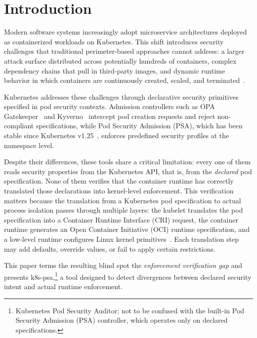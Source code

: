 \documentclass[sigconf]{acmart}
\begin{document}

\maketitle

\section{Introduction}

Modern software systems increasingly adopt microservice architectures deployed as containerized workloads on Kubernetes. This shift introduces security challenges that traditional perimeter-based approaches cannot address: a larger attack surface distributed across potentially hundreds of containers, complex dependency chains that pull in third-party images, and dynamic runtime behavior in which containers are continuously created, scaled, and terminated~\cite{wong2023, devipriya2023}.

Kubernetes addresses these challenges through declarative security primitives specified in pod security contexts. Admission controllers such as OPA Gatekeeper~\cite{gatekeeper2024} and Kyverno~\cite{kyverno2024} intercept pod creation requests and reject non-compliant specifications, while Pod Security Admission (PSA), which has been stable since Kubernetes v1.25~\cite{k8spsa2022}, enforces predefined security profiles at the namespace level.

Despite their differences, these tools share a critical limitation: every one of them reads security properties from the Kubernetes API, that is, from the \emph{declared} pod specification. None of them verifies that the container runtime has correctly translated those declarations into kernel-level enforcement. This verification matters because the translation from a Kubernetes pod specification to actual process isolation passes through multiple layers: the kubelet translates the pod specification into a Container Runtime Interface (CRI) request, the container runtime generates an Open Container Initiative (OCI) runtime specification, and a low-level runtime configures Linux kernel primitives~\cite{k8sseccomp2024}. Each translation step may add defaults, override values, or fail to apply certain restrictions.

This paper terms the resulting blind spot the \emph{enforcement verification gap} and presents k8s-psa,\footnote{Kubernetes Pod Security Auditor; not to be confused with the built-in Pod Security Admission (PSA) controller, which operates only on declared specifications.} a tool designed to detect divergences between declared security intent and actual runtime enforcement.
\end{document}
